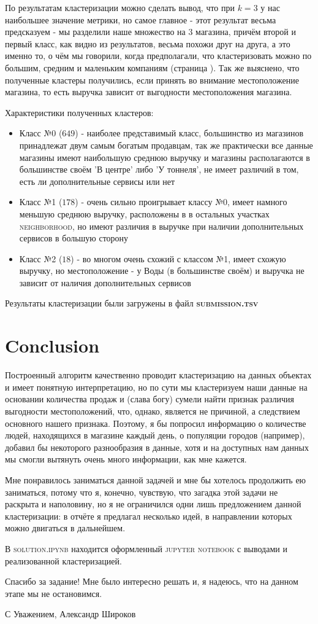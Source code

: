 \documentclass[%
10pt, %
final, %
oneside, %
onecolumn, %
centertags]{article} %
\theoremstyle{plain}
\theoremstyle{definition}
\theoremstyle{remark}
\begin{document}
По результатам кластеризации можно сделать вывод, что при $k=3$ у нас наибольшее значение метрики, но самое главное - этот результат весьма предсказуем - мы разделили наше множество на $3$ магазина, причём второй и первый класс, как видно из результатов, весьма похожи друг на друга, а это именно то, о чём мы говорили, когда предполагали, что кластеризовать можно по большим, средним и маленьким компаниям (страница \pageref{formula2}). Так же выяснено, что полученные кластеры получились, если принять во внимание местоположение магазина, то есть выручка зависит от выгодности местоположения магазина.

Характеристики полученных кластеров:
\begin{itemize}
	\item Класс №0 ($649$) - наиболее представимый класс, большинство из магазинов принадлежат двум самым богатым продавцам, так же практически все данные магазины имеют наибольшую среднюю выручку и магазины располагаются в большинстве своём 'В центре' либо 'У тоннеля', не имеет различий в том, есть ли дополнительные сервисы или нет
	\item Класс №1 ($178$) - очень сильно проигрывает классу №0, имеет намного меньшую среднюю выручку, расположены в в остальных участках \textsc{neighborhood}, но имеют различия в выручке при наличии дополнительных сервисов в большую сторону
	\item Класс №2 ($18$) - во многом очень схожий с классом №1, имеет схожую выручку, но местоположение - у Воды (в большинстве своём) и выручка не зависит от наличия дополнительных сервисов
\end{itemize}

Результаты кластеризации были загружены в файл \textbf{\textsc{submission.tsv}}
\newpage

\section{Conclusion}

Построенный алгоритм качественно проводит кластеризацию на данных объектах и имеет понятную интерпретацию, но по сути мы кластеризуем наши данные на основании количества продаж и (слава богу) сумели найти признак различия выгодности местоположений, что, однако, является не причиной, а следствием основного нашего признака. Поэтому, я бы попросил информацию о количестве людей, находящихся в магазине каждый день, о популяции городов (например), добавил бы некоторого разнообразия в данные, хотя и на доступных нам данных мы смогли вытянуть очень много информации, как мне кажется.

Мне понравилось заниматься данной задачей и мне бы хотелось продолжить ею заниматься, потому что я, конечно, чувствую, что загадка этой задачи не раскрыта и наполовину, но я не ограничился одни лишь предложением данной кластеризации: в отчёте я предлагал несколько идей, в направлении которых можно двигаться в дальнейшем. 

В \textsc{solution.ipynb} находится оформленный \textsc{jupyter notebook} с выводами и реализованной кластеризацией.

Спасибо за задание! Мне было интересно решать и, я надеюсь, что на данном этапе мы не остановимся.

С Уважением, Александр Широков
\end{document}

